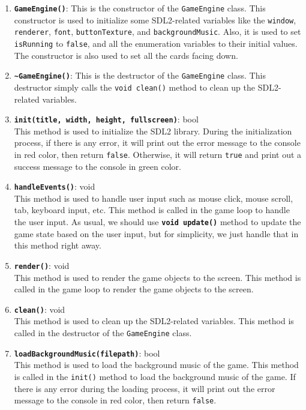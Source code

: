 \begin{enumerate}
    \item \textbf{\texttt{GameEngine()}}: This is the constructor of the \texttt{GameEngine} class. This constructor is used to initialize some SDL2-related variables like the \texttt{window}, \texttt{renderer}, \texttt{font}, \texttt{buttonTexture}, and \texttt{backgroundMusic}. Also, it is used to set \texttt{isRunning} to \texttt{false}, and all the enumeration variables to their initial values. The constructor is also used to set all the cards facing down.
    \item \textbf{\texttt{\~{}GameEngine()}}: This is the destructor of the \texttt{GameEngine} class. This destructor simply calls the \texttt{void clean()} method to clean up the SDL2-related variables.
    \item \textbf{\texttt{init(title, width, height, fullscreen)}}: bool
    \\ This method is used to initialize the SDL2 library. During the initialization process, if there is any error, it will print out the error message to the console in red color, then return \texttt{false}. Otherwise, it will return \texttt{true} and print out a success message to the console in green color. 
    \item \textbf{\texttt{handleEvents()}}: void
    \\ This method is used to handle user input such as mouse click, mouse scroll, tab, keyboard input, etc. This method is called in the game loop to handle the user input. As usual, we should use \textbf{\texttt{void update()}} method to update the game state based on the user input, but for simplicity, we just handle that in this method right away.
    \item \textbf{\texttt{render()}}: void
    \\ This method is used to render the game objects to the screen. This method is called in the game loop to render the game objects to the screen.
    \item \textbf{\texttt{clean()}}: void
    \\ This method is used to clean up the SDL2-related variables. This method is called in the destructor of the \texttt{GameEngine} class.
    \item \textbf{\texttt{loadBackgroundMusic(filepath)}}: bool
    \\ This method is used to load the background music of the game. This method is called in the \texttt{init()} method to load the background music of the game. If there is any error during the loading process, it will print out the error message to the console in red color, then return \texttt{false}. 

\end{enumerate}

